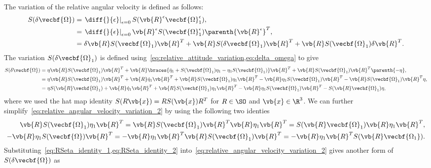 \documentclass[11pt, reqno]{article}    %
\begin{document}
The variation of the relative angular velocity is defined as follows:
\begin{align}\label{eq:relative_angular_velocity_variation_1}
    S(\delta \vecbf{\Omega}) &= \left. \diff{}{\epsilon} \right|_{\epsilon=0} S(\vb{R}^\epsilon  \vecbf{\Omega}^\epsilon_1) , \nonumber\\
    &= \left. \diff{}{\epsilon} \right|_{\epsilon=0} \vb{R}^\epsilon S(\vecbf{\Omega}^\epsilon_1)  \parenth{\vb{R}^\epsilon}^T, \nonumber\\
    &= \delta \vb{R} S(\vecbf{\Omega}_1) \vb{R}^T  + \vb{R} S(\delta \vecbf{\Omega}_1) \vb{R}^T + \vb{R} S(\vecbf{\Omega}_1) \delta \vb{R}^T .
\end{align}
The variation \( S(\delta \vecbf{\Omega}_1)\) is defined using~\cref{eq:relative_attitude_variation,eq:delta_omega} to give
\begin{align}\label{eq:relative_angular_velocity_variation_2}
    S(\delta \vecbf{\Omega}) &= \eta \vb{R} S( \vecbf{\Omega}_1) \vb{R}^T + \vb{R} \braces{\dot{\eta}_1 + S(\vecbf{\Omega}_1) \eta_1 - \eta_1 S(\vecbf{\Omega}_1)} \vb{R}^T + \vb{R} S( \vecbf{\Omega}_1) \vb{R}^T \parenth{- \eta} , \nonumber \\
    &= \eta \vb{R} S(\vecbf{\Omega}_1)\vb{R}^T + \vb{R} \dot{\eta}_1 \vb{R}^T + \vb{R} S(\vecbf{\Omega}_1) \eta_1 \vb{R}^T - \vb{R} \eta_1 S(\vecbf{\Omega}_1)\vb{R}^T - \vb{R} S(\vecbf{\Omega}_1) \vb{R}^T \eta , \nonumber\\
    &= \eta S(\vb{R} \vecbf{\Omega}_1) + \vb{R} \dot{\eta}_1 \vb{R}^T + \vb{R} S(\vecbf{\Omega}_1)\eta_1 \vb{R}^T - \vb{R} \eta_1 S(\vecbf{\Omega}_1) \vb{R}^T - S(\vb{R} \vecbf{\Omega}_1) \eta ,
\end{align}
where we used the hat map identity \( S(R \vb{x}) = R S(\vb{x}) R^T\) for \( R \in \SO\) and \( \vb{x} \in \R^3\).
We can further simplify~\cref{eq:relative_angular_velocity_variation_2} by using the following two identies
\begin{align}
    \vb{R} S(\vecbf{\Omega}_1) \eta_1 \vb{R}^T = \vb{R}S(\vecbf{\Omega}_1) \vb{R}^T \vb{R} \eta_1 \vb{R}^T = S(\vb{R} \vecbf{\Omega}_1) \vb{R} \eta_1 \vb{R}^T , \label{eq:RSeta_identity_1}\\
    -\vb{R} \eta_1 S(\vecbf{\Omega})\vb{R}^T = - \vb{R} \eta_1 \vb{R}^T \vb{R} S(\vecbf{\Omega}_1)\vb{R}^T = -\vb{R} \eta_1 \vb{R}^T S(\vb{R} \vecbf{\Omega_1}) . \label{eq:RSeta_identity_2}
\end{align}
Substituting~\cref{eq:RSeta_identity_1,eq:RSeta_identity_2} into~\cref{eq:relative_angular_velocity_variation_2} gives another form of \( S(\delta \vecbf{\Omega})\) as
\end{document}
